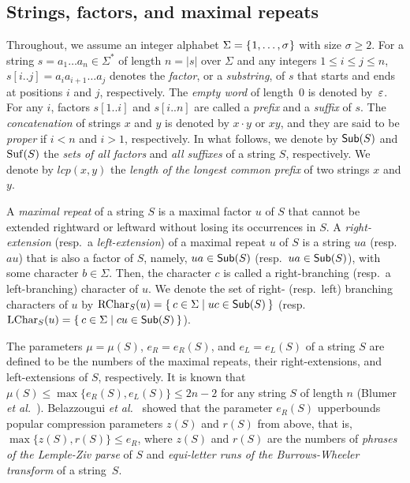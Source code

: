 \documentclass{article}
\begin{document}
\subsection{Strings, factors, and maximal repeats}

Throughout, we assume an integer alphabet $\Sigma = \{\kern0.05em1, \dots, \sigma\kern0.05em\}$ with size $\sigma \ge 2$. 
For a string $s = a_1\dots a_n \in \Sigma^*$ of length $n = |s|$ over $\Sigma$ and any integers $1\le i\le j\le n$, $s[i..j] = a_i a_{i+1}\dots a_j$ denotes the \textit{factor}, or a \textit{substring}, of $s$ that starts and ends at positions $i$ and $j$, respectively. The \textit{empty word} of length~$0$ is denoted by~$\varepsilon$. For any $i$, factors $s[1..i]$ and $s[i..n]$ are called a \textit{prefix} and a \textit{suffix} of $s$. The \textit{concatenation} of strings $x$ and $y$ is denoted by $x\cdot y$ or $xy$, and they are said to be \textit{proper} if $i < n$ and $i > 1$, respectively. 
In what follows, we denote by $\mathsf{Sub}(S)$ and $\mathrm{Suf}(S)$ the \textit{sets of all factors} and \textit{all suffixes} of a string $S$, respectively. We denote by $lcp(x, y)$ the \textit{length of the longest common prefix} of two strings $x$ and $y$. 

A \textit{maximal repeat} of a string $S$ is a maximal factor $u$ of $S$ that cannot be extended rightward or leftward without losing its occurrences in $S$. A \textit{right-extension} (resp.~a \textit{left-extension}) of a maximal repeat $u$ of $S$ is a string $ua$ (resp.~$au$) that is also a factor of $S$, namely, $ua \in \mathsf{Sub}(S)$ (resp.~$ua \in \mathsf{Sub}(S)$), with some character $b \in \Sigma$. Then, the character $c$ is called a right-branching (resp.~a left-branching) character of $u$. We denote the set of right- (resp.~left) branching characters of $u$ by $\mathrm{RChar}_{S}(u) = \{\kern0.2em c \in \Sigma \mid uc \in \mathsf{Sub}(S) \kern0.2em\}$ (resp.~$\mathrm{LChar}_{S}(u) = \{\kern0.2em c \in \Sigma \mid cu \in \mathsf{Sub}(S) \kern0.2em\}$). 

The parameters $\mu = \mu(S)$, $e_R = e_R(S)$, and $e_L = e_L(S)$ of a string $S$ are defined to be the numbers of the maximal repeats, their right-extensions, and left-extensions of $S$, respectively. It is known that $\mu(S) \le \max\{e_R(S), e_L(S)\} \le 2n - 2$ for any string $S$ of length $n$ (Blumer \textit{et al.}~\cite{blumer1987complete}).
Belazzougui \textit{et al.}~\cite{belazzougui:nunial:gagie:prezza:raffinot2015composite} showed that the parameter $e_R(S)$ upperbounds popular compression parameters $z(S)$ and $r(S)$ from above, that is, $\max\{z(S), r(S)\} \le e_R$, where $z(S)$ and $r(S)$ are the numbers of \textit{phrases of the Lemple-Ziv parse} of $S$ and \textit{equi-letter runs of the Burrows-Wheeler transform} of a string~$S$. 
\end{document}
